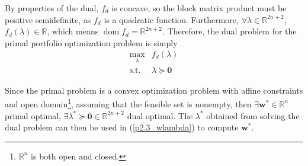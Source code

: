 \documentclass{article}
\numberwithin{equation}{section}
\begin{document}
By properties of the dual, $ f_d $ is concave, so the block matrix product
must be positive semidefinite, as $ f_d $ is a quadratic function. Furthermore,
$ \forall \lambda \in \mathbb{R}^{2n + 2} $, $ f_d(\lambda) \in \mathbb{R} $,
which means $ \operatorname{dom} f_d = \mathbb{R}^{2n + 2} $. Therefore, the
dual problem for the primal portfolio optimization problem is simply
\begin{equation*}
    \begin{array}{ll}
        \displaystyle\max_\lambda & f_d(\lambda) \\
        \text{s.t.} & \lambda \succeq \mathbf{0}
    \end{array}
\end{equation*}

Since the primal problem is a convex optimization problem with affine
constraints and open domain\footnote{
    $ \mathbb{R}^n $ is both open and closed.
}, assuming that the feasible set is nonempty, then $ \exists \mathbf{w}^* \in
\mathbb{R}^n $ primal optimal, $ \exists \lambda^* \succeq \mathbf{0} \in
\mathbb{R}^{2n + 2} $ dual optimal. The $ \lambda^* $ obtained from solving
the dual problem can then be used in (\ref{p2.3_wlambda}) to compute
$ \mathbf{w}^* $.
\end{document}
